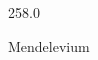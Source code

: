\documentclass[12pt]{article}
\begin{document}
\hfill{}
\vfill
\begin{center}
  {\fontsize{50}{60}
  }

  258.0

Mendelevium
\end{center}
\vfill
\end{document}
